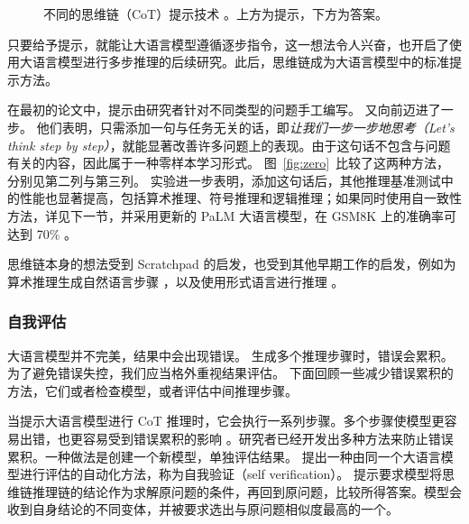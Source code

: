 \begin{figure}
  \begin{center}
    
    \caption{不同的思维链（CoT）提示技术 \citep{wei2022chain,kojima2022large,gao2023pal,plaat2024reasoning}。上方为提示，下方为答案。}\label{fig:cot} \label{fig:zero} \label{fig:pal}
  \end{center}
\end{figure}

只要给予提示，就能让大语言模型遵循逐步指令，这一想法令人兴奋，也开启了使用大语言模型进行多步推理的后续研究。此后，思维链成为大语言模型中的标准提示方法。

在最初的论文中，提示由研究者针对不同类型的问题手工编写。
\citet{kojima2022large} 又向前迈进了一步。
他们表明，只需添加一句与任务无关的话，即{\em 让我们一步一步地思考（Let's think step by step）}，就能显著改善许多问题上的表现。由于这句话不包含与问题有关的内容，因此属于一种零样本学习形式。
图~\ref{fig:zero}~比较了这两种方法，分别见第二列与第三列。
实验进一步表明，添加这句话后，其他推理基准测试中的性能也显著提高，包括算术推理、符号推理和逻辑推理；如果同时使用自一致性方法，详见下一节，并采用更新的 PaLM 大语言模型，在 GSM8K 上的准确率可达到 70\% \citep{wang2022self}。

思维链本身的想法受到 Scratchpad \citep{nye2021show} 的启发，也受到其他早期工作的启发，例如为算术推理生成自然语言步骤 \citep{ling2017program,cobbe2021training}，以及使用形式语言进行推理 \citep{roy2016solving,chiang2018semantically,amini2019mathqa,chen2019neural}。

\subsubsection{自我评估}
大语言模型并不完美，结果中会出现错误。
生成多个推理步骤时，错误会累积。为了避免错误失控，我们应当格外重视结果评估。
下面回顾一些减少错误累积的方法，它们或者检查模型，或者评估中间推理步骤。

当提示大语言模型进行 CoT 推理时，它会执行一系列步骤。多个步骤使模型更容易出错，也更容易受到错误累积的影响 \citep{weng2022large,xiao2023survey}。研究者已经开发出多种方法来防止错误累积。一种做法是创建一个新模型，单独评估结果。
\citet{weng2022large} 提出一种由同一个大语言模型进行评估的自动化方法，称为自我验证（self verification）。
提示要求模型将思维链推理链的结论作为求解原问题的条件，再回到原问题，比较所得答案。模型会收到自身结论的不同变体，并被要求选出与原问题相似度最高的一个。

